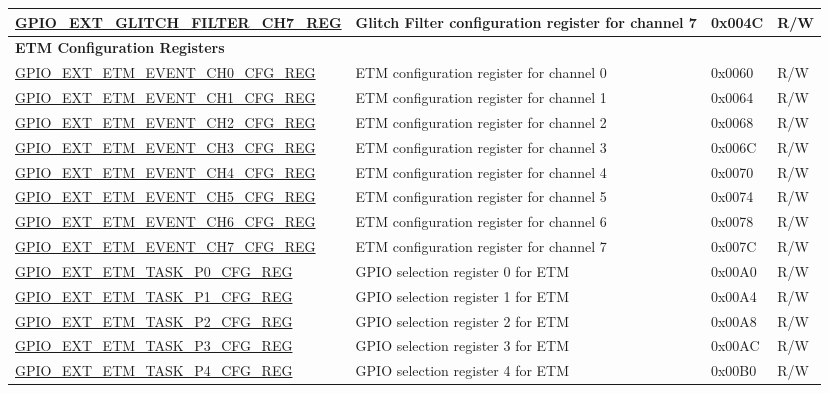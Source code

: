 \begin{longtable}{ | p{6.2cm} | p{7.0cm} | p{1.3cm} | p{1cm} | }
\hyperref[regdesc:GPIOSDGLITCHFILTERCHNREG]{GPIO\_EXT\_GLITCH\_FILTER\_CH7\_REG} & Glitch Filter configuration register for channel 7 & 0x004C & R/W \\ \hline
\multicolumn{4}{|l|}{\textbf{ETM Configuration Registers}} \\ \hline
\hyperref[regdesc:GPIOSDETMEVENTCHNCFGREG]{GPIO\_EXT\_ETM\_EVENT\_CH0\_CFG\_REG} & ETM configuration register for channel 0 & 0x0060 & R/W \\ \hline
\hyperref[regdesc:GPIOSDETMEVENTCHNCFGREG]{GPIO\_EXT\_ETM\_EVENT\_CH1\_CFG\_REG} & ETM configuration register for channel 1 & 0x0064 & R/W \\ \hline
\hyperref[regdesc:GPIOSDETMEVENTCHNCFGREG]{GPIO\_EXT\_ETM\_EVENT\_CH2\_CFG\_REG} & ETM configuration register for channel 2 & 0x0068 & R/W \\ \hline
\hyperref[regdesc:GPIOSDETMEVENTCHNCFGREG]{GPIO\_EXT\_ETM\_EVENT\_CH3\_CFG\_REG} & ETM configuration register for channel 3 & 0x006C & R/W \\ \hline
\hyperref[regdesc:GPIOSDETMEVENTCHNCFGREG]{GPIO\_EXT\_ETM\_EVENT\_CH4\_CFG\_REG} & ETM configuration register for channel 4 & 0x0070 & R/W \\ \hline
\hyperref[regdesc:GPIOSDETMEVENTCHNCFGREG]{GPIO\_EXT\_ETM\_EVENT\_CH5\_CFG\_REG} & ETM configuration register for channel 5 & 0x0074 & R/W \\ \hline
\hyperref[regdesc:GPIOSDETMEVENTCHNCFGREG]{GPIO\_EXT\_ETM\_EVENT\_CH6\_CFG\_REG} & ETM configuration register for channel 6 & 0x0078 & R/W \\ \hline
\hyperref[regdesc:GPIOSDETMEVENTCHNCFGREG]{GPIO\_EXT\_ETM\_EVENT\_CH7\_CFG\_REG} & ETM configuration register for channel 7 & 0x007C & R/W \\ \hline
\hyperref[regdesc:GPIOSDETMTASKP0CFGREG]{GPIO\_EXT\_ETM\_TASK\_P0\_CFG\_REG} & GPIO selection register 0 for ETM & 0x00A0 & R/W \\ \hline
\hyperref[regdesc:GPIOSDETMTASKP1CFGREG]{GPIO\_EXT\_ETM\_TASK\_P1\_CFG\_REG} & GPIO selection register 1 for ETM & 0x00A4 & R/W \\ \hline
\hyperref[regdesc:GPIOSDETMTASKP2CFGREG]{GPIO\_EXT\_ETM\_TASK\_P2\_CFG\_REG} & GPIO selection register 2 for ETM & 0x00A8 & R/W \\ \hline
\hyperref[regdesc:GPIOSDETMTASKP3CFGREG]{GPIO\_EXT\_ETM\_TASK\_P3\_CFG\_REG} & GPIO selection register 3 for ETM & 0x00AC & R/W \\ \hline
\hyperref[regdesc:GPIOSDETMTASKP4CFGREG]{GPIO\_EXT\_ETM\_TASK\_P4\_CFG\_REG} & GPIO selection register 4 for ETM & 0x00B0 & R/W \\ \hline

\end{longtable}
